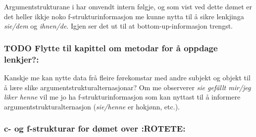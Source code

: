 \documentclass[11pt,a4paper,oneside,draft]{book}
\begin{document}
Argumentstrukturane i \Last har omvendt intern følgje, og som vist ved
dette dømet er det heller ikkje noko f-strukturinformasjon me kunne
nytta til å sikre lenkjinga \emph{sie/dem} og \emph{ihnen/de}. Igjen ser det ut
til at bottom-up-informasjon trengst.


\subsubsection{\textbf{TODO} Flytte til kapittel om metodar for å oppdage lenkjer?:}
\label{sec-3.15.4.1}

Kanskje me kan nytte data frå fleire førekomstar med andre subjekt
og objekt til å lære slike argumentstrukturalternasjonar?  Om me
observerer \emph{sie gefällt mir/jeg liker henne} vil me jo ha
f-strukturinformasjon som kan nyttast til å informere
argumentstrukturalternasjon (\emph{sie/henne} er hokjønn, etc.).

\subsubsection{c- og f-strukturar for dømet over \textbf{:ROTETE:}}
\label{sec-3.15.4.2}


\avmoptions{}
\begin{avm}
\end{avm}
\end{document}
